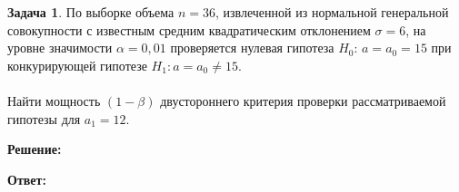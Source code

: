 \documentclass[a4paper,11pt]{article}
\newenvironment{shdd}{\begin{mdframed}[backgroundcolor=shadecolor]}{\end{mdframed}}
\theoremstyle{definition}
\newtheorem{problem}{Задача}\setlength{\parindent}{0pt}
\newenvironment{solution}
{\begin{shdd}
     \textbf{Решение:}\par\setlength{\parindent}{0pt}}
     {
\end{shdd}}
\newenvironment{answer}
{\par\noindent\textbf{Ответ:}}
{\par}
\begin{document}
    \newpage
    \begin{problem}
        По выборке объема \(n = 36\), извлеченной из нормальной генеральной совокупности
        с известным средним квадратическим отклонением \(\sigma = 6\), на уровне значимости
        \(\alpha = 0,01\) проверяется нулевая гипотеза \(H_0\):
        \(a = a_0 = 15\) при конкурирующей гипотезе \(H_1 : a = a_0 \neq 15\).\\
        \\
        Найти мощность \((1-\beta)\) двустороннего критерия проверки рассматриваемой гипотезы для \(a_1 = 12\).

        \begin{solution}
%
%
%

        \end{solution}

        \begin{answer}
        \end{answer}

    \end{problem}
\end{document}
